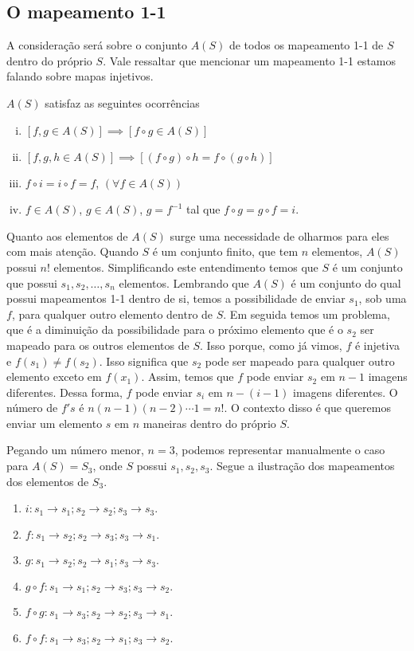\subsection{O mapeamento 1-1}
A consideração será sobre o conjunto $A(S)$ de todos os mapeamento 1-1 de $S$ dentro do próprio $S$. Vale ressaltar que mencionar um mapeamento 1-1 estamos falando sobre mapas injetivos.
\begin{lemma}
    $A(S)$ satisfaz as seguintes ocorrências
    \begin{enumerate}[i.]
        \item $\left[f,g \in A(S)\right] \implies \left[f\circ g \in A(S)\right]$
        \item $\left[f,g,h \in A(S)\right] \implies \left[(f\circ g)\circ h = f\circ (g\circ h)\right]$
        \item $f\circ i = i\circ f = f$, $(\forall f \in A(S))$
        \item $f \in A(S)$, $g\in A(S)$, $g=f^{-1}$ tal que $f\circ g= g\circ f = i$.
    \end{enumerate}
\end{lemma}
Quanto aos elementos de $A(S)$ surge uma necessidade de olharmos para eles com mais atenção. Quando $S$ é um conjunto finito, que tem $n$ elementos, $A(S)$ possui $n!$ elementos. Simplificando este entendimento temos que $S$ é um conjunto que possui $s_{1},s_{2},\ldots , s_{n}$ elementos. Lembrando que $A(S)$ é um conjunto do qual possui mapeamentos 1-1 dentro de si, temos a possibilidade de enviar $s_{1}$, sob uma $f$, para qualquer outro elemento dentro de $S$. Em seguida temos um problema, que é a diminuição da possibilidade para o próximo elemento que é o $s_{2}$ ser mapeado para os outros elementos de $S$. Isso porque, como já vimos, $f$ é injetiva e $f(s_{1}) \neq f(s_{2})$. Isso significa que $s_{2}$ pode ser mapeado para qualquer outro elemento exceto em $f(x_{1})$. Assim, temos que $f$ pode enviar $s_{2}$ em $n-1$ imagens diferentes. Dessa forma, $f$ pode enviar $s_{i}$ em $n-(i-1)$ imagens diferentes. O número de $f's$ é $n(n-1)(n-2)\cdots 1=n!$. O contexto disso é que queremos enviar um elemento $s$ em $n$ maneiras dentro do próprio $S$.
\begin{exmp}
    Pegando um número menor, $n = 3$, podemos representar manualmente o caso para $A(S)=S_{3}$, onde $S$ possui $s_{1},s_{2},s_{3}$. Segue a ilustração dos mapeamentos dos elementos de $S_{3}$.
    \begin{enumerate}[1.]
        \item $i:s_{1} \to s_{1}; s_{2} \to s_{2}; s_{3} \to s_{3}.$
        \item $f:s_{1} \to s_{2}; s_{2} \to s_{3}; s_{3} \to s_{1}.$
        \item $g:s_{1} \to s_{2}; s_{2} \to s_{1}; s_{3} \to s_{3}.$
        \item $g\circ f:s_{1} \to s_{1}; s_{2} \to s_{3}; s_{3} \to s_{2}.$
        \item $f\circ g:s_{1} \to s_{3}; s_{2} \to s_{2}; s_{3} \to s_{1}.$
        \item $f\circ f:s_{1} \to s_{3}; s_{2} \to s_{1}; s_{3} \to s_{2}.$
    \end{enumerate}
\end{exmp}

